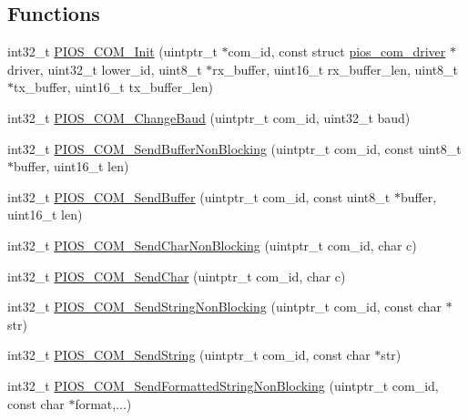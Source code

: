 \subsection*{\-Functions}
\begin{DoxyCompactItemize}
\item 
int32\-\_\-t \hyperlink{group___p_i_o_s___c_o_m_gae5f5c6d4dd82ce508ba42da9c90a7166}{\-P\-I\-O\-S\-\_\-\-C\-O\-M\-\_\-\-Init} (uintptr\-\_\-t $\ast$com\-\_\-id, const struct \hyperlink{structpios__com__driver}{pios\-\_\-com\-\_\-driver} $\ast$driver, uint32\-\_\-t lower\-\_\-id, uint8\-\_\-t $\ast$rx\-\_\-buffer, uint16\-\_\-t rx\-\_\-buffer\-\_\-len, uint8\-\_\-t $\ast$tx\-\_\-buffer, uint16\-\_\-t tx\-\_\-buffer\-\_\-len)
\item 
int32\-\_\-t \hyperlink{group___p_i_o_s___c_o_m_gaa370cb6fb2677b6260ae4204ba26b2b3}{\-P\-I\-O\-S\-\_\-\-C\-O\-M\-\_\-\-Change\-Baud} (uintptr\-\_\-t com\-\_\-id, uint32\-\_\-t baud)
\item 
int32\-\_\-t \hyperlink{group___p_i_o_s___c_o_m_ga60982fe515c4938f64fd872b8992a55b}{\-P\-I\-O\-S\-\_\-\-C\-O\-M\-\_\-\-Send\-Buffer\-Non\-Blocking} (uintptr\-\_\-t com\-\_\-id, const uint8\-\_\-t $\ast$buffer, uint16\-\_\-t len)
\item 
int32\-\_\-t \hyperlink{group___p_i_o_s___c_o_m_ga06a9a4136683f78051b9e72e5edb32f8}{\-P\-I\-O\-S\-\_\-\-C\-O\-M\-\_\-\-Send\-Buffer} (uintptr\-\_\-t com\-\_\-id, const uint8\-\_\-t $\ast$buffer, uint16\-\_\-t len)
\item 
int32\-\_\-t \hyperlink{group___p_i_o_s___c_o_m_gaf31c3839043db5312b9b9429102964bd}{\-P\-I\-O\-S\-\_\-\-C\-O\-M\-\_\-\-Send\-Char\-Non\-Blocking} (uintptr\-\_\-t com\-\_\-id, char c)
\item 
int32\-\_\-t \hyperlink{group___p_i_o_s___c_o_m_ga7b6113a05ea60bcd661bbc5e10a5fe0e}{\-P\-I\-O\-S\-\_\-\-C\-O\-M\-\_\-\-Send\-Char} (uintptr\-\_\-t com\-\_\-id, char c)
\item 
int32\-\_\-t \hyperlink{group___p_i_o_s___c_o_m_gaff37e41578d22e06d0f29394340e1762}{\-P\-I\-O\-S\-\_\-\-C\-O\-M\-\_\-\-Send\-String\-Non\-Blocking} (uintptr\-\_\-t com\-\_\-id, const char $\ast$str)
\item 
int32\-\_\-t \hyperlink{group___p_i_o_s___c_o_m_gae03e4cae94285f9551800750e0974a84}{\-P\-I\-O\-S\-\_\-\-C\-O\-M\-\_\-\-Send\-String} (uintptr\-\_\-t com\-\_\-id, const char $\ast$str)
\item 
int32\-\_\-t \hyperlink{group___p_i_o_s___c_o_m_gaf4608e2b544b62a5130238c2534e19f8}{\-P\-I\-O\-S\-\_\-\-C\-O\-M\-\_\-\-Send\-Formatted\-String\-Non\-Blocking} (uintptr\-\_\-t com\-\_\-id, const char $\ast$format,...)

\end{DoxyCompactItemize}
